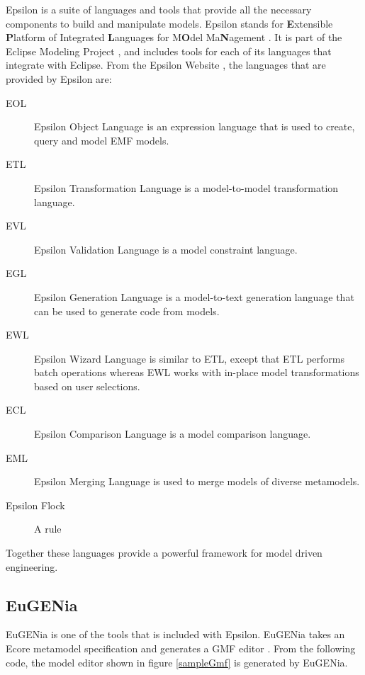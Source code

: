 Epsilon is a suite of languages and tools that provide all the necessary components to build and manipulate models. Epsilon stands for \textbf{E}xtensible \textbf{P}latform of Integrated \textbf{L}anguages for M\textbf{O}del Ma\textbf{N}agement \citep{epsilonWebsite}. It is part of the Eclipse Modeling Project \citep{ecliplseModelingProjectSite}, and includes tools for each of its languages that integrate with Eclipse. From the Epsilon Website \citep{epsilonWebsite}, the languages that are provided by Epsilon are:

\begin{description}
\item[EOL] Epsilon Object Language is an expression language that is used to create, query and model EMF models.
\item[ETL] Epsilon Transformation Language is a model-to-model transformation language.
\item[EVL] Epsilon Validation Language is a model constraint language.
\item[EGL] Epsilon Generation Language is a model-to-text generation language that can be used to generate code from models.
\item[EWL] Epsilon Wizard Language is similar to ETL, except that ETL performs batch operations whereas EWL works with in-place model transformations based on user selections.
\item[ECL] Epsilon Comparison Language is a model comparison language.
\item[EML] Epsilon Merging Language is used to merge models of diverse metamodels.
\item[Epsilon Flock] A rule
\end{description}

Together these languages provide a powerful framework for model driven engineering.

\subsection{EuGENia}
EuGENia is one of the tools that is included with Epsilon. EuGENia takes an Ecore metamodel specification and generates a GMF editor \citep{eugeniaSite}. From the following code, the model editor shown in figure \ref{sampleGmf} is generated by EuGENia.



